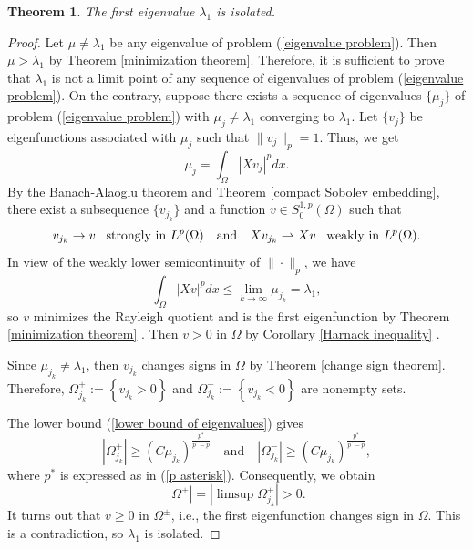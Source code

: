 \documentclass[a4paper,12pt,reqno]{amsart}
\renewcommand\eqref[1]{(\ref{#1})} %
\numberwithin{equation}{section}
\theoremstyle{plain}
\newtheorem{thm}{Theorem}[section]
\theoremstyle{definition}
\begin{document}
\begin{thm}\label{isolated theorem}
The first eigenvalue $\lambda_{1}$ is isolated.
\end{thm}
\begin{proof}
Let $\mu\neq \lambda_{1}$ be any eigenvalue of problem \eqref{eigenvalue problem}. Then $\mu > \lambda_{1}$ by Theorem \ref{minimization theorem}.
Therefore, it is sufficient to prove that $\lambda_{1}$ is not a limit point of any sequence of eigenvalues of problem \eqref{eigenvalue problem}. On the contrary, suppose there exists a sequence of eigenvalues $\{\mu_{j}\}$ of problem \eqref{eigenvalue problem} with $\mu_{j}\neq\lambda_{1}$ converging to $\lambda_{1}$. Let $\{v_{j}\}$ be  eigenfunctions associated with $\mu_{j}$ such that $\|v_{j}\|_{p}=1$. Thus, we get
\begin{equation*}
\mu_{j}=\int_{\Omega}|Xv_{j}|^{p}dx. 
\end{equation*}
By the Banach-Alaoglu theorem and Theorem \ref{compact Sobolev embedding}, there exist a subsequence $\{v_{j_{k}}\}$ and a function $v\in S_{0}^{1,p}(\Omega)$ such that
\begin{equation*}
v_{j_{k}} \to v\enskip \text{ strongly in } L^{p}(\Omega)\quad \text{and} \quad X v_{j_{k}} \rightharpoonup  X v \enskip \text{ weakly in } L^{p}(\Omega). 
\end{equation*}
In view of the weakly lower semicontinuity of $\|\cdot\|_{p}$, we have
\begin{equation*}
\int_{\Omega}|Xv|^{p}dx \leq \lim_{k\to\infty}\mu_{j_{k}} =\lambda_{1}, 
\end{equation*}
so $v$ minimizes the Rayleigh quotient and is the first eigenfunction by Theorem \ref{minimization theorem} . Then $v>0$ in $\Omega$ by Corollary \ref{Harnack inequality} .

Since $\mu_{j_{k}} \neq \lambda_{1}$, then $v_{j_{k}}$ changes signs in $\Omega$ by Theorem \ref{change sign theorem}. Therefore, $\Omega_{j_{k}}^{+}:=\left\{v_{j_{k}}>0\right\}$ and $\Omega_{j_{k}}^{-}:=\left\{v_{j_{k}}<0\right\}$ are nonempty sets.

The lower bound \eqref{lower bound of eigenvalues} gives
$$
\left|\Omega_{j_{k}}^{+}\right| \geq \left(C\mu_{j_{k}}\right)^{\frac{p^{*}}{p^{*}-p}}\quad \text{and} \quad\left|\Omega_{j_{k}}^{-}\right| \geq \left(C\mu_{j_{k}}\right)^{\frac{p^{*}}{p^{*}-p}},$$
where $p^{*}$ is expressed as in \eqref{p asterisk}.
Consequently, we obtain
$$\left|\Omega^{\pm}\right|=\left|\limsup\Omega_{j_{k}}^{\pm}\right|> 0.$$ 
It turns out that $v\geq 0$ in $\Omega^{\pm}$, i.e., the first eigenfunction changes sign in $\Omega$. This is a contradiction, so $\lambda_{1}$ is isolated.
\end{proof}
\end{document}

